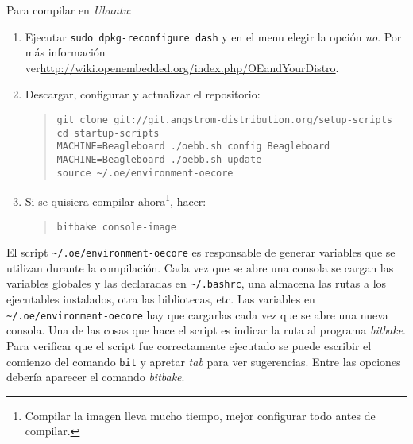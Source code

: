 \documentclass[main]{subfiles}
\begin{document}
Para compilar en \textit{Ubuntu}:
\begin{enumerate}
\item Ejecutar \verb+sudo dpkg-reconfigure dash+ y en el menu elegir la opción \textit{no}. Por más información ver\newline\url{http://wiki.openembedded.org/index.php/OEandYourDistro}.
\item Descargar, configurar y actualizar el repositorio:
\begin{quote}
\begin{verbatim}
git clone git://git.angstrom-distribution.org/setup-scripts
cd startup-scripts
MACHINE=Beagleboard ./oebb.sh config Beagleboard
MACHINE=Beagleboard ./oebb.sh update
source ~/.oe/environment-oecore
\end{verbatim}
\end{quote}
\item Si se quisiera compilar ahora\footnote{Compilar la imagen lleva mucho tiempo, mejor configurar todo antes de compilar.}, hacer:
\begin{quote}
\begin{verbatim}
bitbake console-image
\end{verbatim}
\end{quote}
\end{enumerate}

El script \verb+~/.oe/environment-oecore+ es responsable de generar variables que se utilizan durante la compilación. Cada vez que se abre una consola se cargan las variables globales y las declaradas en \verb+~/.bashrc+, una almacena las rutas a los ejecutables instalados, otra las bibliotecas, etc. Las variables en \verb+~/.oe/environment-oecore+ hay que cargarlas cada vez que se abre una nueva consola. Una de las cosas que hace el script es indicar la ruta al programa \textit{bitbake}. Para verificar que el script fue correctamente ejecutado se puede escribir el comienzo del comando \verb+bit+ y apretar \textit{tab} para ver sugerencias. Entre las opciones debería aparecer el comando \textit{bitbake}.\\
\end{document}

